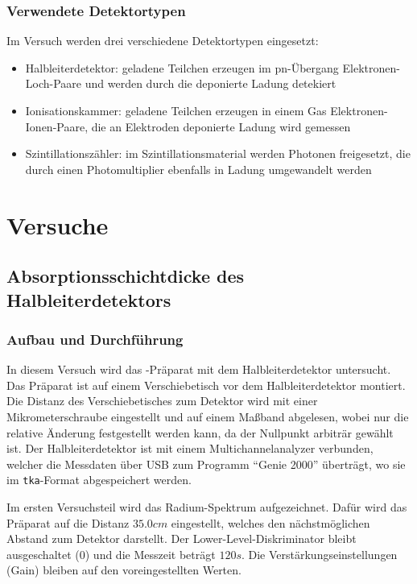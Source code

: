 \documentclass{../Misc/MontavonLaTeX/Montavon}
\begin{document}
\subsubsection{Verwendete Detektortypen}
Im Versuch werden drei verschiedene Detektortypen eingesetzt: 
\begin{itemize}
\item Halbleiterdetektor: geladene Teilchen erzeugen im pn-Übergang Elektronen-Loch-Paare und werden durch die deponierte Ladung detekiert 
\item Ionisationskammer: geladene Teilchen erzeugen in einem Gas Elektronen-Ionen-Paare, die an Elektroden deponierte Ladung wird gemessen 
\item Szintillationszähler: im Szintillationsmaterial werden Photonen freigesetzt, die durch einen Photomultiplier ebenfalls in Ladung umgewandelt werden
\end{itemize}

\section{Versuche}
\subsection{Absorptionsschichtdicke des Halbleiterdetektors}
\subsubsection{Aufbau und Durchführung}
In diesem Versuch wird das -Präparat mit dem Halbleiterdetektor untersucht. Das Präparat ist auf einem Verschiebetisch vor dem Halbleiterdetektor montiert. Die Distanz des Verschiebetisches zum Detektor wird mit einer Mikrometerschraube eingestellt und auf einem Maßband abgelesen, wobei nur die relative Änderung festgestellt werden kann, da der Nullpunkt arbiträr gewählt ist. Der Halbleiterdetektor ist mit einem Multichannelanalyzer verbunden, welcher die Messdaten über USB zum Programm \enquote{Genie 2000} überträgt, wo sie im \texttt{tka}-Format abgespeichert werden.

Im ersten Versuchsteil wird das Radium-Spektrum aufgezeichnet. Dafür wird das Präparat auf die Distanz $35.0 \unit{cm}$ eingestellt, welches den nächstmöglichen Abstand zum Detektor darstellt. 
Der Lower-Level-Diskriminator bleibt ausgeschaltet ($0$) und die Messzeit beträgt $120 \unit{s}$. Die Verstärkungseinstellungen (Gain) bleiben auf den voreingestellten Werten.
\end{document}
